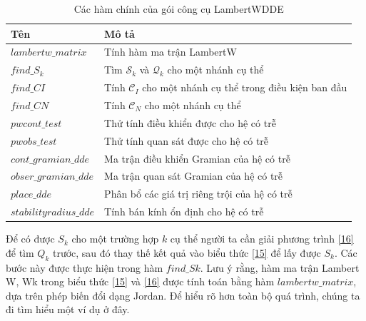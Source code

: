 \begin{table}[ht]
	\centering	
	\begin{tabular}{ll}
		\hline 
		Tên & Mô tả \\ 
		\hline 
		$lambertw\_ matrix$ & Tính hàm ma trận LambertW \\ 
		
		$find\_ S_k$ & Tìm $\mathcal{S}_k$ và $\mathcal{Q}_k$ cho một nhánh cụ thể \\ 
		
		$find\_ CI$ & Tính $\mathcal{C}_I$ cho một nhánh cụ thể trong điều kiện ban đầu \\ 
		
		$find\_ CN$ & Tính $\mathcal{C}_N$ cho một nhánh cụ thể \\ 
		
		$pwcont\_ test$ & Thử tính điều khiển được cho hệ có trễ \\ 
		
		$pwobs\_test$ & Thử tính quan sát được cho hệ có trễ \\ 
		
		$cont\_gramian\_dde$ & Ma trận điều khiển Gramian của hệ có trễ \\ 
		
		$obser\_gramian\_dde$ & Ma trận quan sát Gramian của hệ  có trễ \\ 
		
		$place\_dde$ & Phân bổ các giá trị riêng trội của hệ có trễ \\ 
		
		$stabilityradius\_dde$ & Tính bán kính ổn định cho hệ có trễ \\ 
		
		\hline
	\end{tabular}
	\caption{Các hàm chính của gói công cụ LambertWDDE}
	\label{bang2}  
\end{table}


Để có được $S_k$ cho một trường hợp $k$ cụ thể người ta cần giải phương trình \eqref{16} để tìm $Q_k$ trước, sau đó thay thế kết quả vào biểu thức \eqref{15} để lấy được $S_k$. Các bước này được thực hiện trong hàm $find\_Sk$. Lưu ý rằng, hàm ma trận Lambert W, Wk trong biểu thức \eqref{15} và \eqref{16} được tính toán bằng hàm $lambertw\_matrix$, dựa trên phép biến đổi dạng Jordan. Để hiểu rõ hơn toàn bộ quá trình, chúng ta đi tìm hiểu một ví dụ ở đây. 

